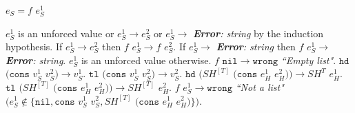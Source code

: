 \begin{case}

$e_{S}=f$ $e_{S}^{1}$

$e_{S}^{1}$ is an unforced value or $e_{S}^{1}\rightarrow e_{S}^{2}$ or $e_{S}^{1}\rightarrow$ \emph{\textbf{Error}: string} by the induction hypothesis.  If $e_{S}^{1}\rightarrow e_{S}^{2}$ then $f$ $e_{S}^{1}\rightarrow f$ $e_{S}^{2}$.  If $e_{S}^{1}\rightarrow$ \emph{\textbf{Error}: string} then $f$ $e_{S}^{1}\rightarrow$ \emph{\textbf{Error}: string}.  $e_{S}^{1}$ is an unforced value otherwise.  $f$ $\mathtt{nil}\rightarrow\mathtt{wrong}$ \emph{``Empty list"}.  $\mathtt{hd}$ $(\mathtt{cons}$ $v_{S}^{1}$ $v_{S}^{2})\rightarrow v_{S}^{1}$.  $\mathtt{tl}$ $(\mathtt{cons}$ $v_{S}^{1}$ $v_{S}^{2})\rightarrow v_{S}^{2}$.  $\mathtt{hd}$ $(SH^{[T]}$ $(\mathtt{cons}$ $e_{H}^{1}$ $e_{H}^{2}))\rightarrow SH^{T}$ $e_{H}^{1}$.  $\mathtt{tl}$ $(SH^{[T]}$ $(\mathtt{cons}$ $e_{H}^{1}$ $e_{H}^{2}))\rightarrow SH^{[T]}$ $e_{H}^{2}$.  $f$ $e_{S}^{1}\rightarrow\mathtt{wrong}$ \emph{``Not a list"} $(e_{S}^{1}\not\in\lbrace\mathtt{nil},\mathtt{cons}$ $v_{S}^{1}$ $v_{S}^{2},SH^{[T]}$ $(\mathtt{cons}$ $e_{H}^{1}$ $e_{H}^{2})\rbrace)$.

\end{case}